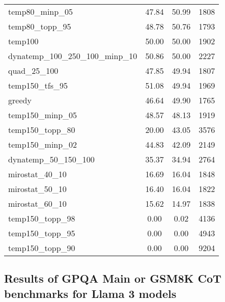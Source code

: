 \documentclass{article}
\begin{document}
\begin{table}[t!]
\begin{tabular}{lccc}
        \rowcolor{gray!10} temp80\_minp\_05 & 47.84 & 50.99 & 1808 \\
        temp80\_topp\_95 & 48.78 & 50.76 & 1793 \\
        \rowcolor{gray!10} temp100 & 50.00 & 50.00 & 1902 \\
        dynatemp\_100\_250\_100\_minp\_10 & 50.86 & 50.00 & 2227 \\
        \rowcolor{gray!10} quad\_25\_100 & 47.85 & 49.94 & 1807 \\
        temp150\_tfs\_95 & 51.08 & 49.94 & 1969 \\
        \rowcolor{gray!10} greedy & 46.64 & 49.90 & 1765 \\
        temp150\_minp\_05 & 48.57 & 48.13 & 1919 \\
        \rowcolor{gray!10} temp150\_topp\_80 & 20.00 & 43.05 & 3576 \\
        temp150\_minp\_02 & 44.83 & 42.09 & 2149 \\
        \rowcolor{gray!10} dynatemp\_50\_150\_100 & 35.37 & 34.94 & 2764 \\
        mirostat\_40\_10 & 16.69 & 16.04 & 1848 \\
        \rowcolor{gray!10} mirostat\_50\_10 & 16.40 & 16.04 & 1822 \\
        mirostat\_60\_10 & 15.62 & 14.97 & 1838 \\
        \rowcolor{gray!10} temp150\_topp\_98 & 0.00 & 0.02 & 4136 \\
        temp150\_topp\_95 & 0.00 & 0.00 & 4943 \\
        \rowcolor{gray!10} temp150\_topp\_90 & 0.00 & 0.00 & 9204 \\
        \hline
    \end{tabular}
    \label{app:tab:alpaca_ablation}
\end{table}


\subsection{Results of {GPQA Main or GSM8K CoT} benchmarks for Llama 3 models}
\end{document}
